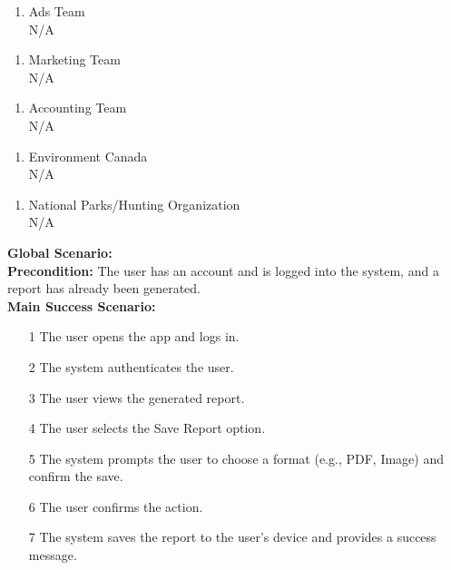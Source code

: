 \documentclass[]{article}
\begin{document}
\begin{enumerate}[{\bf BE1.}]
\begin{enumerate}[{\bf VP2.}]
    \item Ads Team \\
    N/A
\end{enumerate}

\begin{enumerate}[{\bf VP3.}]
    \item Marketing Team \\
    N/A
\end{enumerate}

\begin{enumerate}[{\bf VP4.}]
    \item Accounting Team \\
    N/A
\end{enumerate}

\begin{enumerate}[{\bf VP5.}]
    \item Environment Canada \\
    N/A
\end{enumerate}

\begin{enumerate}[{\bf VP6.}]
    \item National Parks/Hunting Organization \\
    N/A
\end{enumerate}

\textbf{Global Scenario:} \\

\textbf{Precondition:} The user has an account and is logged into the system, and a report has already been generated. \\

\textbf{Main Success Scenario:}
\begin{enumerate}
    \item[1] The user opens the app and logs in.
    \item[2] The system authenticates the user.
    \item[3] The user views the generated report.
    \item[4] The user selects the Save Report option.
    \item[5] The system prompts the user to choose a format (e.g., PDF, Image) and confirm the save.
    \item[6] The user confirms the action.
    \item[7] The system saves the report to the user’s device and provides a success message.
\end{enumerate}


\end{enumerate}
\end{document}
